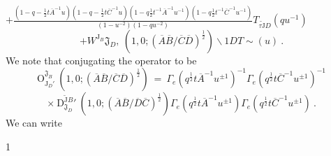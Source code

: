 \documentclass[a4paper,12pt]{article}
\begin{document}
$+\displaystyle \frac{(1-q-\frac{1}{2}t\overline{A}^{-1}u)(1-q-\frac{1}{2}t\overline{C}^{-1}u)(1-q\frac{1}{2}t^{-1}\overline{A}^{-1}u^{-1})(1-q\frac{1}{2}t^{-1}\overline{C}^{-1}u^{-1})}{(1-u^{-2})(1-qu^{-2})}T_{\tilde{\tau \mathrm{J}}D}(qu^{-1})$
$$
+W^{\mathrm{J}_{B}}\mathfrak{J}_{D},\ (1,0;(\overline{A}\overline{B}/\overline{C}\overline{D})^{\frac{1}{2}})\backslash 1DT\sim(u)\ .
$$
We note that conjugating the operator to be
$$
\mathrm{O}_{\mathrm{J}_{D}'}^{\mathfrak{J}_{B}}\ (1,0;(\overline{A}\overline{B}/\overline{C}\overline{D})^{\frac{1}{2}})\ =\ \Gamma_{e}(q^{\frac{1}{2}}t\overline{A}^{-1}u^{\pm 1})^{-1}\Gamma_{e}(q^{\frac{1}{2}}t\overline{C}^{-1}u^{\pm 1})^{-1}
$$
$$
\times\ \mathrm{D}_{\mathfrak{J}_{D}}^{\tilde{\mathrm{J}}B}'\ (1,0;(\overline{A}\overline{B}/\overline{D}\overline{C})^{\frac{1}{2}})\Gamma_{e}(q^{\frac{1}{2}}t\overline{A}^{-1}u^{\pm 1})\Gamma_{e}(q^{\frac{1}{2}}t\overline{C}^{-1}u^{\pm 1})\ .
$$
We can write

1
\end{document}
